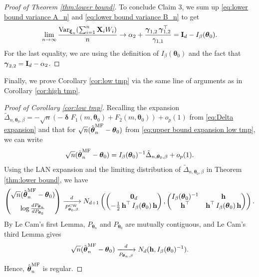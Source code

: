 \documentclass[preprint,reqno]{imsart}
\newcommand{\ttheta}{\boldsymbol{\theta}}
\newcommand{\I}{\mathbf{I}_{\mathnormal{d}}}
\DeclareMathOperator{\bh}{\textbf{h}}
\DeclareMathOperator{\ggamma}{\boldsymbol{\gamma}}
\DeclareMathOperator{\ddelta}{\boldsymbol{\delta}}
\DeclareMathOperator{\Var}{Var}
\newcommand{\X}{\mathbf{X}}
\newcommand{\xxi}{\boldsymbol \xi}
\DeclareMathOperator{\sumin}{\sum_{\mathnormal i=1}^{\mathnormal n}}
\newcommand{\thetamf}{\hat{\boldsymbol \theta}^{\text{MF}}_{\mathnormal n}}
\begin{document}
\begin{appendix}
\begin{proof}[Proof of Theorem \ref{thm:lower bound}]
To conclude Claim 3, we sum up \eqref{eq:lower bound variance A_n} and \eqref{eq:lower bound variance B_n} to get
$$\lim_{n \to \infty} \frac{\Var_{\xxi_n} (\sumin \X_i W_i)}{n} \to \alpha_2 + \frac{\ggamma_{1,2} \ggamma_{1,2}^\top}{\gamma_{1,1}} = \I - I_{\beta}(\ttheta_0).$$
For the last equality, we are using the definition of $I_{\beta}(\ttheta_0)$ and the fact that $\ggamma_{2,2} = \I - \alpha_2$.
%
%
\end{proof}

Finally, we prove Corollary \ref{cor:low tmp} via the same line of arguments as in Corollary \ref{cor:high tmp}.
\begin{proof}[Proof of Corollary \ref{cor:low tmp}]
    
    Recalling the expansion $\tilde{\Delta}_{n, \ttheta_0, \beta}= -\sqrt{n}(- \ddelta F_1(m, \ttheta_0) + F_2(m, \ttheta_0)) + o_p(1)$
    from \eqref{eq:Delta expansion}
    and that for $\sqrt{n} (\thetamf - \ttheta_0)$ from \eqref{eq:upper bound expansion low tmp}, we can write
    $$\sqrt{n} (\thetamf - \ttheta_0) = I_\beta(\ttheta_0)^{-1} \tilde{\Delta}_{n, \ttheta_0, \beta} +o_p(1).$$
    Using the LAN expansion and the limiting distribution of $\tilde{\Delta}_{n, \ttheta_0, \beta}$ in Theorem \ref{thm:lower bound}, we have
    $$ \begin{pmatrix}
        \vspace{2mm}
        \sqrt{n} (\thetamf - \ttheta_0) \\
        \log \frac{d P_{\ttheta_n}}{d P_{\ttheta_0}}
    \end{pmatrix} \xrightarrow[P_{\ttheta_0,\beta}^\text{CW}]{d} N_{d+1} \left(\begin{pmatrix}
        \mathbf{0}_d \\
        - \frac{1}{2}\bh^\top I_\beta(\ttheta_0) \bh
    \end{pmatrix}, \begin{pmatrix}
        I_\beta(\ttheta_0)^{-1} & \bh \\
        \bh^\top & \bh^\top I_\beta(\ttheta_0) \bh
    \end{pmatrix} \right).$$
    By Le Cam's first Lemma, $P_{\ttheta_n}$ and $P_{\ttheta_0}$ are mutually contiguous, and Le Cam's third Lemma gives
    $$\sqrt{n}(\thetamf - \ttheta_0) \xrightarrow[P_{\ttheta_n,\beta}]{d} N_d(\bh, I_\beta(\ttheta_0)^{-1}).$$
    Hence, $\thetamf$ is regular.
    
    
\end{proof}







\end{appendix}
\end{document}
